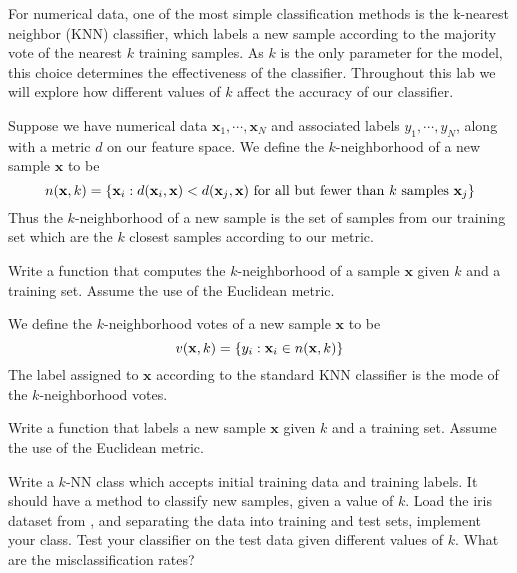 
For numerical data, one of the most simple classification methods is the 
k-nearest neighbor (KNN) classifier, which labels a new sample according 
to the majority vote of the nearest $k$ training samples. 
As $k$ is the only parameter for the model, this choice determines the effectiveness of the classifier. 
Throughout this lab we will explore how different values of $k$ affect the accuracy of our classifier.

Suppose we have numerical data $\mathbf{x}_{1}, \cdots, \mathbf{x}_{N}$ and 
associated labels $y_{1}, \cdots, y_{N}$, along with a metric $d$ on our feature space. 
We define the $k$-neighborhood of a new sample $\mathbf{x}$ to be 
\begin{equation*}
n(\mathbf{x},k) = 
\lbrace\mathbf{x}_{i}:d(\mathbf{x}_{i}, \mathbf{x}) < d(\mathbf{x}_{j}, 
\mathbf{x}) \text{ for all but fewer than } k \text{ samples } \mathbf{x}_{j}\rbrace
\end{equation*}
Thus the $k$-neighborhood of a new sample is the set of samples from our training set 
which are the $k$ closest samples according to our metric.

\begin{problem}
Write a function that computes the $k$-neighborhood of a sample 
$\mathbf{x}$ given $k$ and a training set. Assume the use of the Euclidean metric.
\end{problem}

We define the $k$-neighborhood votes of a new sample $\mathbf{x}$ to be 
\begin{equation*}
v(\mathbf{x},k) = \lbrace y_{i}:\mathbf{x}_{i} \in n(\mathbf{x},k)\rbrace
\end{equation*}
The label assigned to $\mathbf{x}$ according to the standard KNN classifier is the mode of the $k$-neighborhood votes.

\begin{problem}
Write a function that labels a new sample $\mathbf{x}$ given $k$ and a training set. Assume the use of the Euclidean metric.
\end{problem}

\begin{problem}
Write a $k$-NN class which accepts initial training data and training labels. 
It should have a method to classify new samples, given a value of $k$. 
Load the iris dataset from , and separating the data into training and test sets, 
implement your class. Test your classifier on the test data given different values of $k$. 
What are the misclassification rates?
\end{problem}

